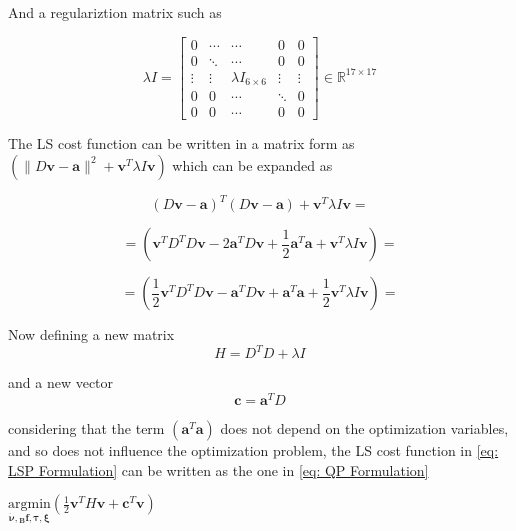 And a regulariztion matrix such as

\begin{equation}
\lambda I = \begin{bmatrix}
0 & \cdots & \cdots & 0 & 0 \\
0 & \ddots & \cdots & 0 & 0 \\
\vdots & \vdots & \lambda I_{6 \times 6} & \vdots & \vdots \\
0 & 0 & \cdots & \ddots & 0 \\
0 & 0 & \cdots & 0 & 0 
\end{bmatrix} \in \mathbb{R}^{17 \times 17}
\end{equation}

The LS cost function can be written in a matrix form as $(\| D\mathbf{v} - \mathbf{a} \|^{2} + \mathbf{v}^{T} \lambda I \mathbf{v})$  which can be expanded as

\begin{equation*}
    (D\mathbf{v} - \mathbf{a})^{T}(D\mathbf{v} - \mathbf{a}) + \mathbf{v}^{T} \lambda I \mathbf{v}=
\end{equation*}

\begin{equation*}
   = (\mathbf{v}^{T} D^{T} D \mathbf{v} - 2\mathbf{a}^{T}D\mathbf{v} +\frac{1}{2} \mathbf{a}^{T}\mathbf{a} + \mathbf{v}^{T} \lambda I \mathbf{v}) =
\end{equation*}

\begin{equation*}
   = (\frac{1}{2} \mathbf{v}^{T} D^{T} D \mathbf{v} - \mathbf{a}^{T}D\mathbf{v} + \mathbf{a}^{T}\mathbf{a} + \frac{1}{2} \mathbf{v}^{T} \lambda I \mathbf{v}) =
\end{equation*}

Now defining a new matrix
\begin{equation*}
  H = D^{T} D + \lambda I 
\end{equation*}

and a new vector 
\begin{equation*}
  \mathbf{c} = \mathbf{a}^{T}D
\end{equation*}

considering that the term $(\mathbf{a}^{T}\mathbf{a})$ does not depend on the optimization variables, and so does not influence the optimization problem, the LS cost function in \eqref{eq: LSP Formulation} can be written as the one in \eqref{eq: QP Formulation}

\begin{center}
$\underset{\bm{\dot{\nu},{}_{B}\mathbf{f},\bm{\tau}}, \bm{\xi}}{\text{argmin}} (\frac{1}{2} \mathbf{v}^{T} H \mathbf{v} + \mathbf{c}^{T} \mathbf{v})$
\end{center}

